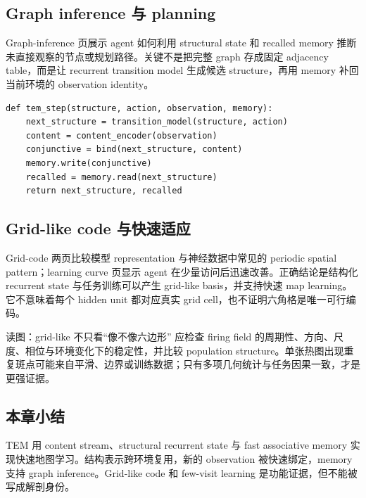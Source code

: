 \subsection{Graph inference 与 planning}

Graph-inference 页展示 agent 如何利用 structural state 和 recalled memory 推断未直接观察的节点或规划路径。关键不是把完整 graph 存成固定 adjacency table，而是让 recurrent transition model 生成候选 structure，再用 memory 补回当前环境的 observation identity。


\begin{lstlisting}[caption={结构状态与快速绑定的概念流程}]
def tem_step(structure, action, observation, memory):
    next_structure = transition_model(structure, action)
    content = content_encoder(observation)
    conjunctive = bind(next_structure, content)
    memory.write(conjunctive)
    recalled = memory.read(next_structure)
    return next_structure, recalled
\end{lstlisting}


\subsection{Grid-like code 与快速适应}

Grid-code 两页比较模型 representation 与神经数据中常见的 periodic spatial pattern；learning curve 页显示 agent 在少量访问后迅速改善。正确结论是结构化 recurrent state 与任务训练可以产生 grid-like basis，并支持快速 map learning。它不意味着每个 hidden unit 都对应真实 grid cell，也不证明六角格是唯一可行编码。




\begin{knowledgebox}{读图：grid-like 不只看“像不像六边形”}
应检查 firing field 的周期性、方向、尺度、相位与环境变化下的稳定性，并比较 population structure。单张热图出现重复斑点可能来自平滑、边界或训练数据；只有多项几何统计与任务因果一致，才是更强证据。
\end{knowledgebox}

\subsection{本章小结}

TEM 用 content stream、structural recurrent state 与 fast associative memory 实现快速地图学习。结构表示跨环境复用，新的 observation 被快速绑定，memory 支持 graph inference。Grid-like code 和 few-visit learning 是功能证据，但不能被写成解剖身份。

